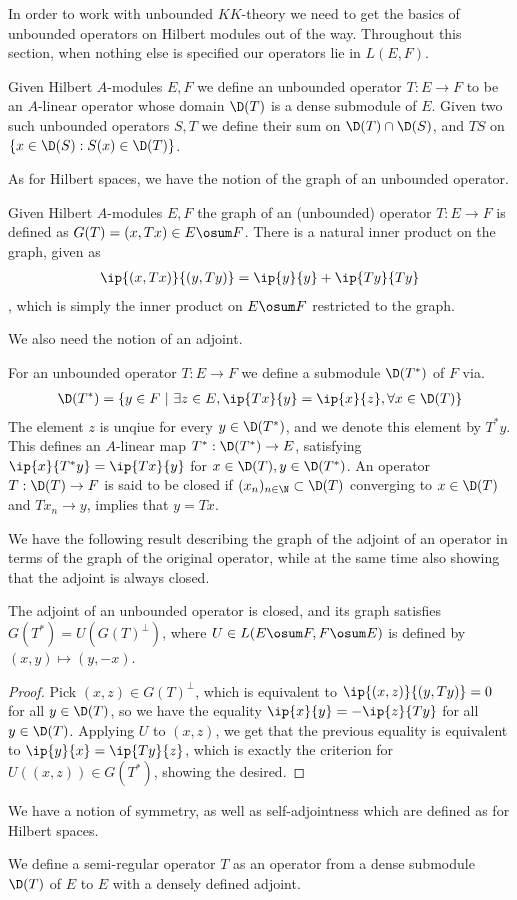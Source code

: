 In order to work with unbounded $KK$-theory we need to get the basics of unbounded operators on Hilbert modules out of the way. Throughout this section, when nothing else is specified our operators lie in $L(E,F)$. 
\begin{definition}
	Given Hilbert $A$-modules $E,F$ we define an unbounded operator $T:E\to F$ to be an $A$-linear operator whose domain $\D(T)$ is a dense submodule of $E$. Given two such unbounded operators $S,T$ we define their sum on $\D(T)\cap \D(S)$, and $TS$ on $\{x\in \D(S):S(x)\in \D(T) \}$.  
\end{definition}
As for Hilbert spaces, we have the notion of the graph of an unbounded operator. 
\begin{definition}
	Given Hilbert $A$-modules $E,F$ the graph of an (unbounded) operator $T:E\to F$ is defined as $G(T)=(x,Tx)\in E\osum F$. There is a natural inner product on the graph, given as \begin{align*} \ip{(x,Tx)}{(y,Ty)}=\ip{y}{y}+\ip{Ty}{Ty} \end{align*}, which is simply the inner product on $E\osum F$ restricted to the graph. 
\end{definition}
We also need the notion of an adjoint.
\begin{definition}
	For an unbounded operator $T: E\to F$ we define a submodule $\D(T^*)$ of $F$ via. 
	\begin{align*}
		\D(T^*)=\{y\in F~| ~\exists z\in E, \ip{Tx}{y}=\ip{x}{z},\forall x\in \D(T)\}
	\end{align*}
The element $z$ is unqiue for every $y\in \D(T^*)$, and we denote this element by $T^*y$. This defines an $A$-linear map $T^*:\D(T^*)\to E$, satisfying $\ip{x}{T^*y}=\ip{Tx}{y}$ for $x\in \D(T),y\in \D(T^*)$. 
An operator $T:\D(T)\to F$ is said to be closed if $(x_n)_{n\in \N}\subset \D(T)$ converging to $x\in \D(T)$ and $Tx_n\to y$, implies that $y=Tx$. 
\end{definition}
We have the following result describing the graph of the adjoint of an operator in terms of the graph of the original operator, while at the same time also showing that the adjoint is always closed. 
\begin{lemma}
	The adjoint of an unbounded operator is closed, and its graph satisfies $G(T^*)=U(G(T)^\perp)$, where $U\in L(E\osum F,F\osum E)$ is defined by $(x,y)\mapsto (y,-x)$.
\end{lemma}
\begin{proof}
	Pick $(x,z)\in G(T)^\perp$, which is equivalent to $\ip{(x,z)}{(y,Ty)}=0$ for all $y\in \D(T)$, so we have the equality $\ip{x}{y}=-\ip{z}{Ty}$ for all $y\in \D(T)$. Applying $U$ to $(x,z)$, we get that the previous equality is equivalent to $\ip{y}{x}=\ip{Ty}{z}$, which is exactly the criterion for $U((x,z))\in G(T^*)$, showing the desired. 
\end{proof} 
We have a notion of symmetry, as well as self-adjointness which are defined as for Hilbert spaces.
\begin{definition}
	We define a semi-regular operator $T$ as an operator from a dense submodule $\D(T)$ of $E$ to $E$ with a densely defined adjoint. 
\end{definition} 

